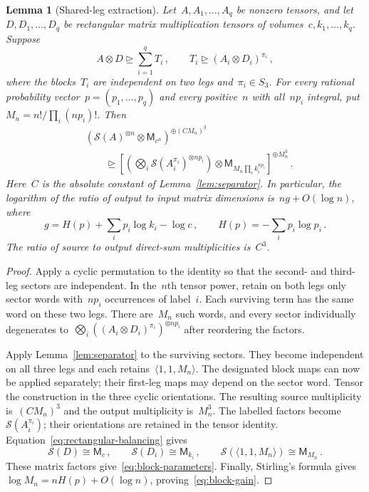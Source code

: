 \documentclass[11pt,letterpaper]{article}
\newtheorem{lemma}[theorem]{Lemma}
\theoremstyle{definition}
\numberwithin{equation}{section}
\newcommand{\MM}{\mathsf M}
\newcommand{\degen}{\unrhd}
\begin{document}
\begin{lemma}[Shared-leg extraction]\label{lem:block-conversion}
Let~$A,A_1,\ldots,A_q$ be nonzero tensors, and let~$D,D_1,\ldots,D_q$ be rectangular matrix multiplication tensors of volumes~$c,k_1,\ldots,k_q$. Suppose
\begin{equation}\label{eq:block-input}
 A\otimes D\degen\sum_{i=1}^q T_i\,,\qquad
 T_i\degen(A_i\otimes D_i)^{\pi_i}\,,
\end{equation}
where the blocks~$T_i$ are independent on two legs and~$\pi_i\in S_3$. For every rational probability vector~$p=(p_1,\ldots,p_q)$ and every positive~$n$ with all~$np_i$ integral, put~$M_n=n!/\prod_i(np_i)!$. Then
\begin{equation}\label{eq:block-parameters}
 \begin{aligned}
 &\left(\mathcal S(A)^{\otimes n}\otimes\MM_{c^n}\right)^{\oplus(CM_n)^3}\\
 &\qquad\degen
 \left[\left(\bigotimes_i\mathcal S(A_i^{\pi_i})^{\otimes np_i}\right)
 \otimes\MM_{M_n\prod_i k_i^{np_i}}\right]^{\oplus M_n^3}\,.
 \end{aligned}
\end{equation}
Here~$C$ is the absolute constant of Lemma~\ref{lem:separator}. In particular, the logarithm of the ratio of output to input matrix dimensions is~$ng+O(\log n)$, where
\begin{equation}\label{eq:block-gain}
 g=H(p)+\sum_i p_i\log k_i-\log c\,,
 \qquad H(p)=-\sum_i p_i\log p_i\,.
\end{equation}
The ratio of source to output direct-sum multiplicities is~$C^3$.
\end{lemma}
\begin{proof}
Apply a cyclic permutation to the identity so that the second- and third-leg sectors are independent. In the~$n$th tensor power, retain on both legs only sector words with~$np_i$ occurrences of label~$i$. Each surviving term has the same word on these two legs. There are~$M_n$ such words, and every sector individually degenerates to~$\bigotimes_i((A_i\otimes D_i)^{\pi_i})^{\otimes np_i}$ after reordering the factors.

Apply Lemma~\ref{lem:separator} to the surviving sectors. They become independent on all three legs and each retains~$\langle1,1,M_n\rangle$. The designated block maps can now be applied separately; their first-leg maps may depend on the sector word. Tensor the construction in the three cyclic orientations. The resulting source multiplicity is~$(CM_n)^3$ and the output multiplicity is~$M_n^3$. The labelled factors become~$\mathcal S(A_i^{\pi_i})$; their orientations are retained in the tensor identity. Equation~\eqref{eq:rectangular-balancing} gives
\begin{equation*}
 \mathcal S(D)\cong\MM_c\,,\qquad
 \mathcal S(D_i)\cong\MM_{k_i}\,,\qquad
 \mathcal S(\langle1,1,M_n\rangle)\cong\MM_{M_n}\,.
\end{equation*}
These matrix factors give~\eqref{eq:block-parameters}. Finally, Stirling's formula gives~$\log M_n=nH(p)+O(\log n)$, proving~\eqref{eq:block-gain}.
\end{proof}
\end{document}
